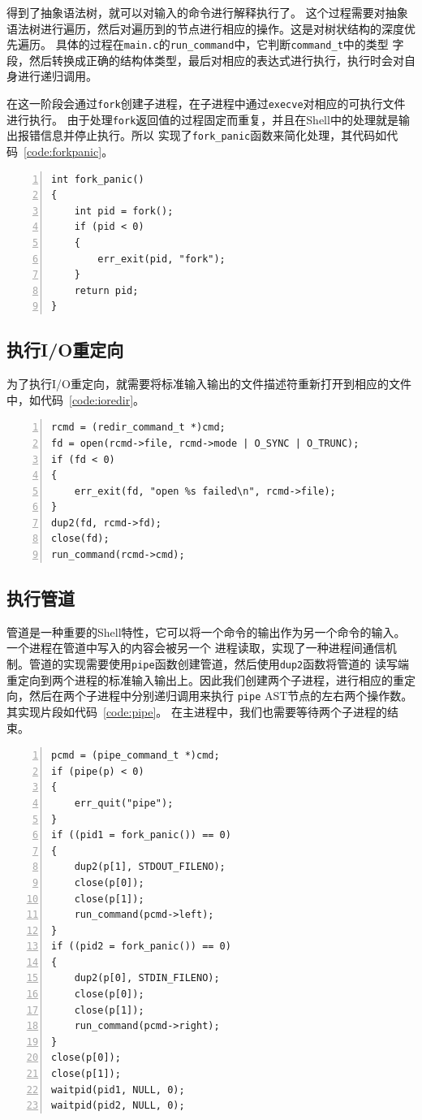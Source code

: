 \documentclass[a4paper,twoside]{article}
\begin{document}
\begin{spacing}{1.2}
得到了抽象语法树，就可以对输入的命令进行解释执行了。
这个过程需要对抽象语法树进行遍历，然后对遍历到的节点进行相应的操作。这是对树状结构的深度优先遍历。
具体的过程在\texttt{main.c}的\texttt{run\_command}中，它判断\texttt{command\_t}中的类型
字段，然后转换成正确的结构体类型，最后对相应的表达式进行执行，执行时会对自身进行递归调用。

在这一阶段会通过\texttt{fork}创建子进程，在子进程中通过\texttt{execve}对相应的可执行文件进行执行。
由于处理\texttt{fork}返回值的过程固定而重复，并且在Shell中的处理就是输出报错信息并停止执行。所以
实现了\texttt{fork\_panic}函数来简化处理，其代码如代码~\ref*{code:forkpanic}。

\begin{lstlisting}[numbers=left,style=CppStyle,caption=fork\_panic,label={code:forkpanic}]
int fork_panic()
{
	int pid = fork();
	if (pid < 0)
	{
		err_exit(pid, "fork");
	}
	return pid;
}
\end{lstlisting}

\subsection{执行I/O重定向}

为了执行I/O重定向，就需要将标准输入输出的文件描述符重新打开到相应的文件中，如代码~\ref{code:ioredir}。

\begin{lstlisting}[numbers=left,style=CppStyle,caption=I/O重定向,label={code:ioredir}]
rcmd = (redir_command_t *)cmd;
fd = open(rcmd->file, rcmd->mode | O_SYNC | O_TRUNC);
if (fd < 0)
{
	err_exit(fd, "open %s failed\n", rcmd->file);
}
dup2(fd, rcmd->fd);
close(fd);
run_command(rcmd->cmd);
\end{lstlisting}


\subsection{执行管道}

管道是一种重要的Shell特性，它可以将一个命令的输出作为另一个命令的输入。一个进程在管道中写入的内容会被另一个
进程读取，实现了一种进程间通信机制。管道的实现需要使用\texttt{pipe}函数创建管道，然后使用\texttt{dup2}函数将管道的
读写端重定向到两个进程的标准输入输出上。因此我们创建两个子进程，进行相应的重定向，然后在两个子进程中分别递归调用来执行
\texttt{pipe} AST节点的左右两个操作数。
其实现片段如代码~\ref{code:pipe}。
在主进程中，我们也需要等待两个子进程的结束。

\begin{lstlisting}[numbers=left,style=CppStyle,caption=fork\_panic,label={code:pipe}]
pcmd = (pipe_command_t *)cmd;
if (pipe(p) < 0)
{
	err_quit("pipe");
}
if ((pid1 = fork_panic()) == 0)
{
	dup2(p[1], STDOUT_FILENO);
	close(p[0]);
	close(p[1]);
	run_command(pcmd->left);
}
if ((pid2 = fork_panic()) == 0)
{
	dup2(p[0], STDIN_FILENO);
	close(p[0]);
	close(p[1]);
	run_command(pcmd->right);
}
close(p[0]);
close(p[1]);
waitpid(pid1, NULL, 0);
waitpid(pid2, NULL, 0);
\end{lstlisting}


\end{spacing}
\end{document}

